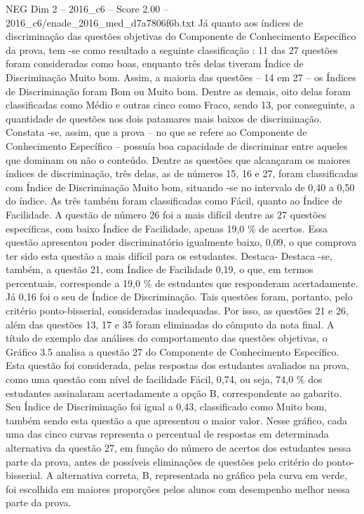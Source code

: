 \begin{textsample}{NEG Dim 2 – 2016\_c6 – Score 2.00 – 2016\_c6/enade\_2016\_med\_d7a7806f6b.txt}
Já quanto aos índices de discriminação das questões objetivas do Componente de Conhecimento Específico da prova, tem -se como resultado a seguinte classificação : 11 das 27 questões foram consideradas como boas, enquanto três delas tiveram Índice de Discriminação Muito bom.
Assim, a maioria das questões – 14 em 27 – os Índices de Discriminação foram Bom ou Muito bom.
Dentre as demais, oito delas foram classificadas como Médio e outras cinco como Fraco, sendo 13, por conseguinte, a quantidade de questões nos dois patamares mais baixos de discriminação.
Constata -se, assim, que a prova – no que se refere ao Componente de Conhecimento Específico – possuía boa capacidade de discriminar entre aqueles que dominam ou não o conteúdo.
Dentre as questões que alcançaram os maiores índices de discriminação, três delas, as de números 15, 16 e 27, foram classificadas com Índice de Discriminação Muito bom, situando -se no intervalo de 0,40 a 0,50 do índice.
As três também foram classificadas como Fácil, quanto ao Índice de Facilidade.
A questão de número 26 foi a mais difícil dentre as 27 questões específicas, com baixo Índice de Facilidade, apenas 19,0 \% de acertos.
Essa questão apresentou poder discriminatório igualmente baixo, 0,09, o que comprova ter sido esta questão a mais difícil para os estudantes.
Destaca- Destaca -se, também, a questão 21, com Índice de Facilidade 0,19, o que, em termos percentuais, corresponde a 19,0 \% de estudantes que responderam acertadamente.
Já 0,16 foi o seu de Índice de Discriminação.
Tais questões foram, portanto, pelo critério ponto-bisserial, consideradas inadequadas.
Por isso, as questões 21 e 26, além das questões 13, 17 e 35 foram eliminadas do cômputo da nota final.
A título de exemplo das análises do comportamento das questões objetivas, o Gráfico 3.5 analisa a questão 27 do Componente de Conhecimento Específico.
Esta questão foi considerada, pelas respostas dos estudantes avaliados na prova, como uma questão com nível de facilidade Fácil, 0,74, ou seja, 74,0 \% dos estudantes assinalaram acertadamente a opção B, correspondente ao gabarito.
Seu Índice de Discriminação foi igual a 0,43, classificado como Muito bom, também sendo esta questão a que apresentou o maior valor.
Nesse gráfico, cada uma das cinco curvas representa o percentual de respostas em determinada alternativa da questão 27, em função do número de acertos dos estudantes nessa parte da prova, antes de possíveis eliminações de questões pelo critério do ponto-bisserial.
A alternativa correta, B, representada no gráfico pela curva em verde, foi escolhida em maiores proporções pelos alunos com desempenho melhor nessa parte da prova.

\end{textsample}
